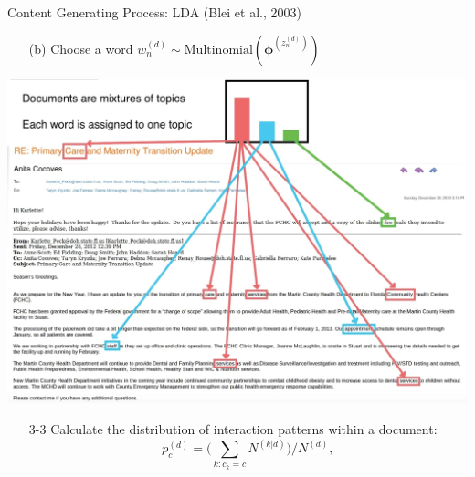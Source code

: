 \documentclass[10pt]{beamer}
\theoremstyle{definition}
\theoremstyle{remark}
\begin{document}
\begin{frame}{Content Generating Process: LDA (Blei et al., 2003)}
\begin{minipage}{0.62\linewidth}
\begin{itemize}
\begin{itemize}
			\item[(b)] Choose a word $w_n^{(d)} \sim\mbox{Multinomial} (\boldsymbol{\phi}^{(z_n^{(d)})})$
		\end{itemize} 
			\end{itemize}
		\end{minipage}
		\begin{minipage}{0.36\linewidth}
	\includegraphics[width=1\textwidth]{figures/LDAimage.jpeg}
		\end{minipage}
		\vspace{0.2cm}
				\begin{itemize}\item[3-3] Calculate the distribution of interaction patterns within a document:
		 \footnotesize\begin{equation*}
		p_c^{(d)} = \Big({\sum\limits_{k: c_k=c} N^{(k|d)}}\Big)/{N^{(d)}},
		\end{equation*}\normalsize
	\end{itemize}
\ei	
\end{frame}
\end{document}
